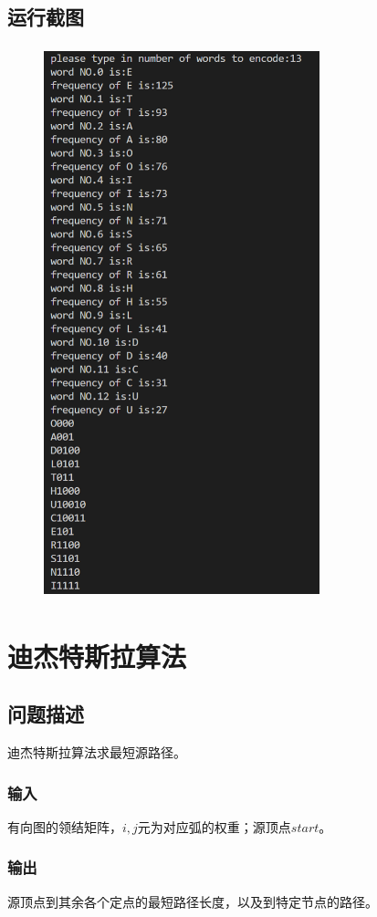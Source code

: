 \documentclass{ctexart}[UTF8]
\begin{document}
    \subsection{运行截图}
    \begin{figure}[H]
        \centering
        \includegraphics[width=8cm,height=16cm]{resources/10_1.png}
    \end{figure}
    
    \section{迪杰特斯拉算法}
    \subsection{问题描述}
    迪杰特斯拉算法求最短源路径。
    \subsubsection{输入}
    有向图的领结矩阵，$i,j$元为对应弧的权重；源顶点$start$。
    \subsubsection{输出}
    源顶点到其余各个定点的最短路径长度，以及到特定节点的路径。
\end{document}
